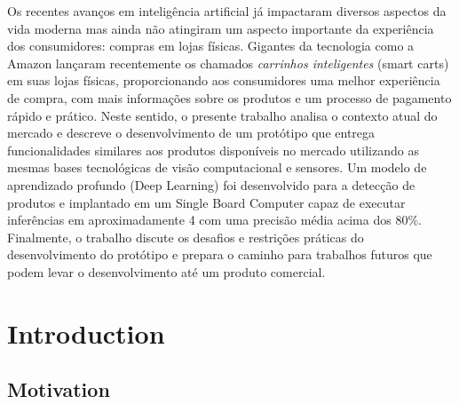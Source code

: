 \documentclass[openright]{normas-utf-tex} %
\begin{document}
\begin{resumo}

Os recentes avanços em inteligência artificial já impactaram diversos aspectos
da vida moderna mas ainda não atingiram um aspecto importante da
experiência dos consumidores: compras em lojas físicas. Gigantes da
tecnologia como a Amazon lançaram recentemente os chamados
\textit{carrinhos inteligentes} (smart carts) em suas lojas físicas,
proporcionando aos consumidores uma melhor experiência de compra, com mais
informações sobre os produtos e um processo de pagamento rápido e prático.
Neste sentido, o presente trabalho analisa o contexto atual do mercado e
descreve o desenvolvimento de um protótipo que entrega funcionalidades
similares aos produtos disponíveis no mercado utilizando as mesmas bases
tecnológicas de visão computacional e sensores. Um modelo de
aprendizado profundo (Deep Learning) foi desenvolvido para a detecção de
produtos e implantado em um Single Board Computer capaz de executar
inferências em aproximadamente 4  com uma
precisão média acima dos 80\%. Finalmente, o trabalho discute os desafios e
restrições práticas do desenvolvimento do protótipo e prepara o caminho
para trabalhos futuros que podem levar o desenvolvimento até um produto
comercial.
\end{resumo}

\listadefiguras %
\listadetabelas %
\listadesiglas %

\sumario %
%
%
%
%

\setcounter{page}{12}

\chapter{Introduction}

\section{Motivation}
\end{document}
